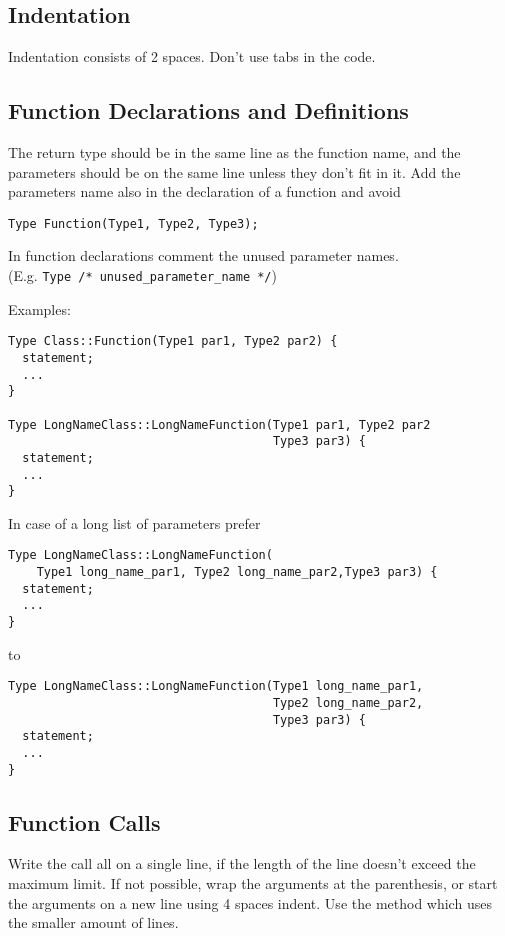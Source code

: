 \documentclass[a4paper]{article}
\newcommand{\inlinecode}[1]{\lstinline|#1|}
\begin{document}
\subsection{Indentation}

Indentation consists of 2 spaces. Don't use tabs in the code.

\subsection{Function Declarations and Definitions}

The return type should be in the same line as the function name, and the parameters should be on the same line unless they don't fit in it.
Add the parameters name also in the declaration of a function and avoid
\begin{lstlisting}
Type Function(Type1, Type2, Type3);
\end{lstlisting}
In function declarations comment the unused parameter names. \\(E.g. \inlinecode{Type /* unused_parameter_name */})

Examples:
\begin{lstlisting}
Type Class::Function(Type1 par1, Type2 par2) {
  statement;
  ...
}

Type LongNameClass::LongNameFunction(Type1 par1, Type2 par2
                                     Type3 par3) {
  statement;
  ...
}
\end{lstlisting}

\vspace{3em}

In case of a long list of parameters prefer
\begin{lstlisting}
Type LongNameClass::LongNameFunction(
    Type1 long_name_par1, Type2 long_name_par2,Type3 par3) {
  statement;
  ...
}
\end{lstlisting}
to
\begin{lstlisting}
Type LongNameClass::LongNameFunction(Type1 long_name_par1,
                                     Type2 long_name_par2,
                                     Type3 par3) {
  statement;
  ...
}
\end{lstlisting}

\subsection{Function Calls}

Write the call all on a single line, if the length of the line doesn't exceed the maximum limit.
If not possible, wrap the arguments at the parenthesis, or start the arguments on a new line using 4 spaces indent.
Use the method which uses the smaller amount of lines.
\end{document}
